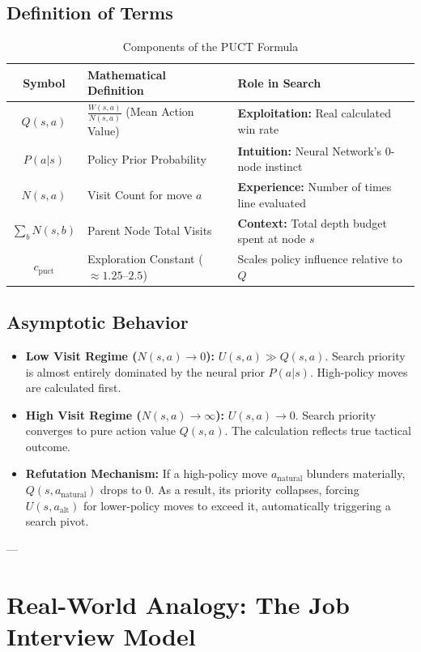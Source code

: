 \documentclass[11pt,a4paper]{article}
\begin{document}
\subsection{Definition of Terms}
\begin{table}[h!]
\centering
\begin{tabular}{|c|l|l|}
\hline
\textbf{Symbol} & \textbf{Mathematical Definition} & \textbf{Role in Search} \\ \hline
$Q(s,a)$ & $\frac{W(s,a)}{N(s,a)}$ (Mean Action Value) & \textbf{Exploitation:} Real calculated win rate \\ \hline
$P(a|s)$ & Policy Prior Probability & \textbf{Intuition:} Neural Network's 0-node instinct \\ \hline
$N(s,a)$ & Visit Count for move $a$ & \textbf{Experience:} Number of times line evaluated \\ \hline
$\sum_b N(s,b)$ & Parent Node Total Visits & \textbf{Context:} Total depth budget spent at node $s$ \\ \hline
$c_{\text{puct}}$ & Exploration Constant ($\approx 1.25$--$2.5$) & Scales policy influence relative to $Q$ \\ \hline
\end{tabular}
\caption{Components of the PUCT Formula}
\end{table}

\subsection{Asymptotic Behavior}
\begin{itemize}
    \item \textbf{Low Visit Regime ($N(s,a) \to 0$):} $U(s,a) \gg Q(s,a)$. Search priority is almost entirely dominated by the neural prior $P(a|s)$. High-policy moves are calculated first.
    \item \textbf{High Visit Regime ($N(s,a) \to \infty$):} $U(s,a) \to 0$. Search priority converges to pure action value $Q(s,a)$. The calculation reflects true tactical outcome.
    \item \textbf{Refutation Mechanism:} If a high-policy move $a_{\text{natural}}$ blunders materially, $Q(s,a_{\text{natural}})$ drops to $0$. As a result, its priority collapses, forcing $U(s, a_{\text{alt}})$ for lower-policy moves to exceed it, automatically triggering a search pivot.
\end{itemize}

---

\section{Real-World Analogy: The Job Interview Model}
\end{document}
